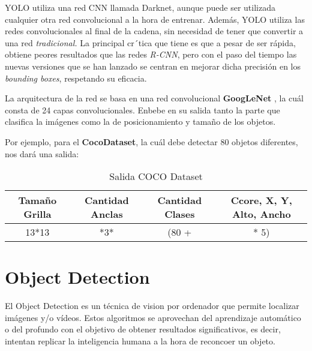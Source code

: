 YOLO utiliza una red CNN llamada Darknet, aunque puede ser utilizada cualquier otra red convolucional a la hora de entrenar. Además, YOLO utiliza las redes convolucionales al final de la cadena, sin necesidad de tener que convertir a una red \textit{tradicional.}
La principal cr´tica que tiene es que a pesar de ser rápida, obtiene peores resultados que las redes \textit{R-CNN}, pero con el paso del tiempo las nuevas versiones que se han lanzado se centran en mejorar dicha precisión en los \textit{bounding boxes}, respetando su eficacia.

La arquitectura de la red se basa en una red convolucional \textbf{GoogLeNet} \cite{googlenet}, la cuál consta de 24 capas convolucionales. Enbebe en su salida tanto la parte que clasifica la imágenes como la de posicionamiento y tamaño de los objetos.


Por ejemplo, para el \textbf{CocoDataset}, la cuál debe detectar 80 objetos diferentes, nos dará una salida:

\begin{table}[h!]
    \centering
    \begin{tabular}{| c | c | c | c |}
        \hline
        Tamaño Grilla & Cantidad Anclas & Cantidad Clases & Ccore, X, Y, Alto, Ancho \\ \hline
        13*13 & *3* & (80 + & * 5) \\ \hline
    \end{tabular}
    \caption{Salida COCO Dataset}
    \label{tab:salidaYOLO}
\end{table}

\clearpage

\section{Object Detection}

El Object Detection \cite{objectDetect} es un técnica de vision por ordenador que permite localizar imágenes y/o vídeos. Estos algoritmos se aprovechan del aprendizaje automático o del profundo 
con el objetivo de obtener resultados significativos, es decir, intentan replicar la inteligencia humana a la hora de reconcoer un objeto.

